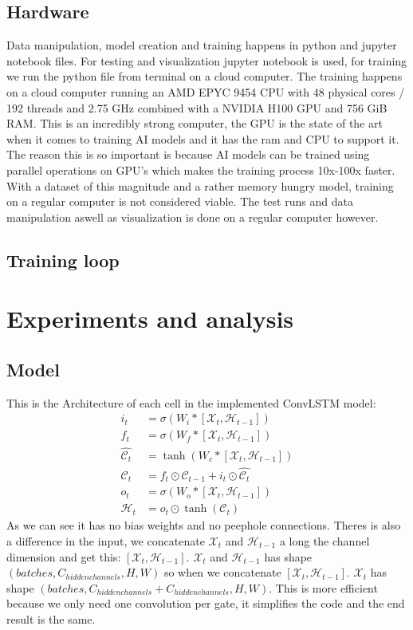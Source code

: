 \documentclass[a4paper,12pt]{article}
\begin{document}
\subsection{Hardware}
Data manipulation, model creation and training happens in python and jupyter notebook files. For testing and visualization jupyter notebook is used, for training we run the python file from terminal on a cloud computer.
The training happens on a cloud computer running an AMD EPYC 9454 CPU with 48 physical cores / 192 threads and 2.75 GHz combined with a NVIDIA H100 GPU and 756 GiB RAM. This is an incredibly strong computer, the GPU is the state of the art when it comes to training AI models and it has the ram and CPU to support it. The reason this is so important is because AI models can be trained using parallel operations on GPU's which makes the training process 10x-100x faster.
With a dataset of this magnitude and a rather memory hungry model, training on a regular computer is not considered viable. The test runs and data manipulation aswell as visualization is done on a regular computer however.
\subsection{Training loop}
\section{Experiments and analysis}
\subsection{Model}
This is the Architecture of each cell in the implemented ConvLSTM model:
\begin{align}
  i_t &= \sigma(W_{i} * [\mathcal{X}_t, \mathcal{H}_{t-1}]) \\
  f_t &= \sigma(W_{f} * [\mathcal{X}_t, \mathcal{H}_{t-1}]) \\
  \hat{\mathcal{C}_t} &= \tanh(W_{c} * [\mathcal{X}_t, \mathcal{H}_{t-1}])\\
  \mathcal{C}_t &= f_t \odot \mathcal{C}_{t-1} + i_t \odot \hat{\mathcal{C}_t} \\
  o_t &= \sigma(W_{o} * [\mathcal{X}_t, \mathcal{H}_{t-1}]) \\
  \mathcal{H}_t &= o_t \odot \tanh(\mathcal{C}_t)
  \end{align}
  As we can see it has no bias weights and no peephole connections. 
  Theres is also a difference in the input, we concatenate $\mathcal{X}_t$ and $\mathcal{H}_{t-1}$ a long the channel dimension and get this: $[\mathcal{X}_t, \mathcal{H}_{t-1}]$. $\mathcal{X}_t$ and $\mathcal{H}_{t-1}$ has shape $(batches, C_{hidden channels}, H, W)$ so when we concatenate $[\mathcal{X}_t, \mathcal{H}_{t-1}]$. $\mathcal{X}_t$ has shape $(batches, C_{hidden channels}+C_{hidden channels}, H, W)$.
  This is more efficient because we only need one convolution per gate, it simplifies the code and the end result is the same. 
\end{document}
